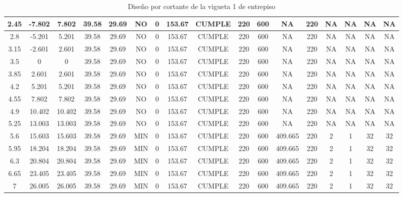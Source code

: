 \begin{table}[h]
{\begin{tabular}{|c|c|c|c|c|c|c|c|c|c|c|c|c|c|c|c|c|}
    \hline
    2.45 & -7.802 & 7.802 & 39.58 & 29.69 & NO  & 0   & 153.67 & CUMPLE & 220 & 600 & NA  & 220 & NA  & NA  & NA  & NA \bigstrut\\
    \hline
    2.8 & -5.201 & 5.201 & 39.58 & 29.69 & NO  & 0   & 153.67 & CUMPLE & 220 & 600 & NA  & 220 & NA  & NA  & NA  & NA \bigstrut\\
    \hline
    3.15 & -2.601 & 2.601 & 39.58 & 29.69 & NO  & 0   & 153.67 & CUMPLE & 220 & 600 & NA  & 220 & NA  & NA  & NA  & NA \bigstrut\\
    \hline
    3.5 & 0   & 0   & 39.58 & 29.69 & NO  & 0   & 153.67 & CUMPLE & 220 & 600 & NA  & 220 & NA  & NA  & NA  & NA \bigstrut\\
    \hline
    3.85 & 2.601 & 2.601 & 39.58 & 29.69 & NO  & 0   & 153.67 & CUMPLE & 220 & 600 & NA  & 220 & NA  & NA  & NA  & NA \bigstrut\\
    \hline
    4.2 & 5.201 & 5.201 & 39.58 & 29.69 & NO  & 0   & 153.67 & CUMPLE & 220 & 600 & NA  & 220 & NA  & NA  & NA  & NA \bigstrut\\
    \hline
    4.55 & 7.802 & 7.802 & 39.58 & 29.69 & NO  & 0   & 153.67 & CUMPLE & 220 & 600 & NA  & 220 & NA  & NA  & NA  & NA \bigstrut\\
    \hline
    4.9 & 10.402 & 10.402 & 39.58 & 29.69 & NO  & 0   & 153.67 & CUMPLE & 220 & 600 & NA  & 220 & NA  & NA  & NA  & NA \bigstrut\\
    \hline
    5.25 & 13.003 & 13.003 & 39.58 & 29.69 & NO  & 0   & 153.67 & CUMPLE & 220 & 600 & NA  & 220 & NA  & NA  & NA  & NA \bigstrut\\
    \hline
    5.6 & 15.603 & 15.603 & 39.58 & 29.69 & MIN & 0   & 153.67 & CUMPLE & 220 & 600 & 409.665 & 220 & 2   & 1   & 32  & 32 \bigstrut\\
    \hline
    5.95 & 18.204 & 18.204 & 39.58 & 29.69 & MIN & 0   & 153.67 & CUMPLE & 220 & 600 & 409.665 & 220 & 2   & 1   & 32  & 32 \bigstrut\\
    \hline
    6.3 & 20.804 & 20.804 & 39.58 & 29.69 & MIN & 0   & 153.67 & CUMPLE & 220 & 600 & 409.665 & 220 & 2   & 1   & 32  & 32 \bigstrut\\
    \hline
    6.65 & 23.405 & 23.405 & 39.58 & 29.69 & MIN & 0   & 153.67 & CUMPLE & 220 & 600 & 409.665 & 220 & 2   & 1   & 32  & 32 \bigstrut\\
    \hline
    7   & 26.005 & 26.005 & 39.58 & 29.69 & MIN & 0   & 153.67 & CUMPLE & 220 & 600 & 409.665 & 220 & 2   & 1   & 32  & 32 \bigstrut\\
    \hline
    \end{tabular}}%
    \caption{Diseño por cortante de la vigueta 1 de entrepiso}
  \label{tab:CORT VT1 EP}%
\end{table}%
